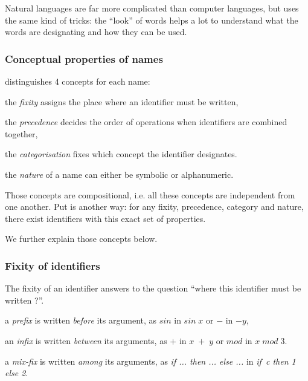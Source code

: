 Natural languages are far more complicated than computer languages, but
{\focal} uses the same kind of tricks: the ``look'' of words helps a lot to
understand what the words are designating and how they can be used.

\subsubsection{Conceptual properties of names}

{\focal} distinguishes 4 concepts for each name:

\begin{citemize}
\item the {\em fixity} assigns the place where an identifier must be written,
\item the {\em precedence} decides the order of operations when
  identifiers are combined together,
\item the {\em categorisation} fixes which concept the identifier designates.
\item the {\em nature} of a name can either be symbolic or alphanumeric.
\end{citemize}

Those concepts are compositional, i.e. all these concepts are independent
from one another. Put is another way: for any fixity, precedence, category
and nature, there exist identifiers with this exact set of properties.

We further explain those concepts below.

\subsubsection{Fixity of identifiers}

The fixity of an identifier answers to the question ``where this identifier
must be written ?''.

\begin{citemize}
\item a {\em prefix} is written {\em before} its argument, as $sin$ in
 $sin\; x$ or $-$ in $- y$,
\item an {\em infix} is written {\em between} its arguments, as $+$ in
 $x\; +\; y$ or $mod$ in $x\; mod \;3$.
\item a {\em mix-fix} is written {\em among} its arguments, as
  {\em if ... then ... else ...} in
  {\em if\ c then 1 else 2}.
\end{citemize}

